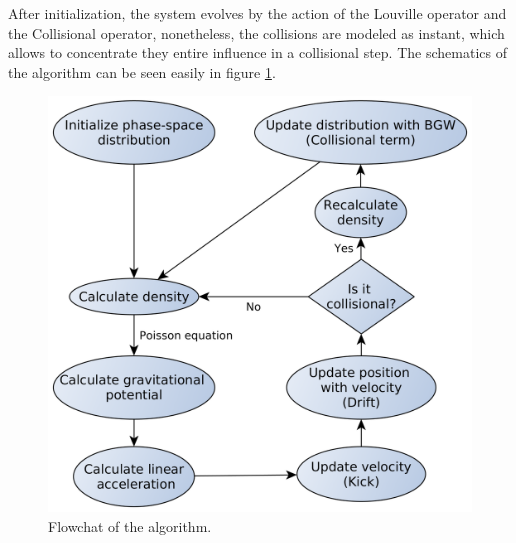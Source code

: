 After initialization, the system evolves by the action of the Louville operator and the Collisional operator, nonetheless, the collisions are modeled as instant, which allows to concentrate they entire influence in a collisional step. The schematics of the algorithm can be seen easily in figure  \ref{flowchart}.

\begin{figure}[ht!]
    \centering
    \includegraphics[scale=0.2]{imag/flowchart.png}
    \caption{Flowchat of the algorithm.}
    \label{flowchart}
\end{figure}


